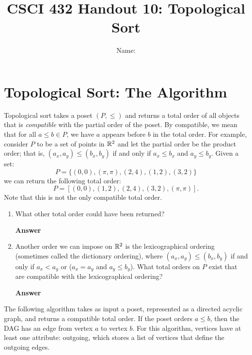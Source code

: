 \documentclass{article}
\title{CSCI 432 Handout 10: Topological Sort}
\author{Name: \rule{3in}{0.15mm}}
\begin{document}
\maketitle

\section*{Topological Sort: The Algorithm}

Topological sort takes a poset $(P,\leq)$ and returns a total order of all
objects that is \emph{compatible} with the partial order of the poset.  By
compatible, we mean that for all $a \leq b \in P$, we have $a$ appears before
$b$ in the total order.  For example, consider $P$ to be a set of points in
${\mathbb R}^2$ and let the partial order be the product order; that is, $(a_x,a_y) \leq
(b_x,b_y)$ if and only if $a_x \leq b_x$ and $a_y \leq b_y$.  Given a set:
$$ P = \{ (0,0), (\pi, \pi), (2,4), (1,2), (3, 2) \}$$
we can return the following total order:
$$P = [ (0,0), (1,2), (2,4), (3,2), (\pi, \pi)].$$
Note that this is not the only compatible total order.

\begin{enumerate}
    \item What other total order
        could have been returned?

    \textbf{Answer}
    \vspace{1in}

    \item Another order we can impose on ${\mathbb R}^2$ is the lexicographical ordering (sometimes
        called the dictionary ordering), where
        $(a_x,a_y) \leq (b_x,b_y)$ if and only if $a_x < a_y$ or ($a_x=a_y$ and $a_y
        \leq b_y$).  What total orders on $P$ exist that are compatible with the
        lexicographical ordering?

    \textbf{Answer}
\end{enumerate}

\newpage
The following algorithm takes as input a poset, represented as a directed
acyclic graph, and returns a compatible total order.  If the poset orders $a
\leq b$, then the DAG has an edge from vertex $a$ to vertex $b$.  For this
algorithm, vertices have at least one attribute: outgoing, which stores a list
of vertices that define the outgoing edges.
\end{document}
